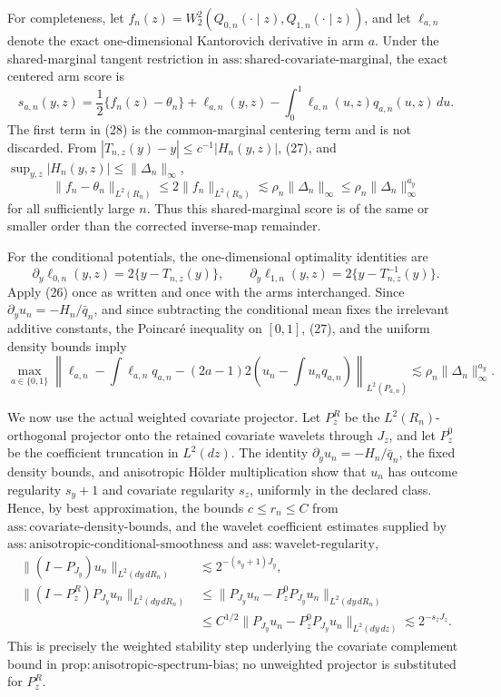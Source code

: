 For completeness, let \(f_n(z)=W_2^2(Q_{0,n}(\cdot\mid z),Q_{1,n}(\cdot\mid z))\), and let \(\ell_{a,n}\) denote the exact one-dimensional Kantorovich derivative in arm \(a\).  Under the shared-marginal tangent restriction in \(\mathrm{ass{:}shared\text{-}covariate\text{-}marginal}\), the exact centered arm score is
\[
s_{a,n}(y,z)
=\frac12\{f_n(z)-\theta_n\}
+\ell_{a,n}(y,z)-\int_0^1\ell_{a,n}(u,z)q_{a,n}(u,z)\,du.
\tag{28}
\]
The first term in (28) is the common-marginal centering term and is not discarded.  From \(|T_{n,z}(y)-y|\le c^{-1}|H_n(y,z)|\), (27), and \(\sup_{y,z}|H_n(y,z)|\le\|\Delta_n\|_\infty\),
\[
\|f_n-\theta_n\|_{L^2(R_n)}
\le2\|f_n\|_{L^2(R_n)}
\lesssim\rho_n\|\Delta_n\|_\infty
\le\rho_n\|\Delta_n\|_\infty^{a_y}
\tag{29}
\]
for all sufficiently large \(n\).  Thus this shared-marginal score is of the same or smaller order than the corrected inverse-map remainder.

For the conditional potentials, the one-dimensional optimality identities are
\[
\partial_y\ell_{0,n}(y,z)=2\{y-T_{n,z}(y)\},
\qquad
\partial_y\ell_{1,n}(y,z)=2\{y-T_{n,z}^{-1}(y)\}.
\]
Apply (26) once as written and once with the arms interchanged.  Since \(\partial_yu_n=-H_n/\bar q_n\), and since subtracting the conditional mean fixes the irrelevant additive constants, the Poincar\'e inequality on \([0,1]\), (27), and the uniform density bounds imply
\[
\max_{a\in\{0,1\}}
\left\|\ell_{a,n}-\int\ell_{a,n}q_{a,n}
-(2a-1)2\left(u_n-\int u_nq_{a,n}\right)\right\|_{L^2(P_{a,n})}
\lesssim \rho_n\|\Delta_n\|_\infty^{a_y}.
\tag{30}
\]

We now use the actual weighted covariate projector.  Let \(P_z^R\) be the \(L^2(R_n)\)-orthogonal projector onto the retained covariate wavelets through \(J_z\), and let \(P_z^0\) be the coefficient truncation in \(L^2(dz)\).  The identity \(\partial_yu_n=-H_n/\bar q_n\), the fixed density bounds, and anisotropic H\"older multiplication show that \(u_n\) has outcome regularity \(s_y+1\) and covariate regularity \(s_z\), uniformly in the declared class.  Hence, by best approximation, the bounds \(c\le r_n\le C\) from \(\mathrm{ass{:}covariate\text{-}density\text{-}bounds}\), and the wavelet coefficient estimates supplied by \(\mathrm{ass{:}anisotropic\text{-}conditional\text{-}smoothness}\) and \(\mathrm{ass{:}wavelet\text{-}regularity}\),
\[
\begin{aligned}
\|(I-P_{J_y})u_n\|_{L^2(dy\,dR_n)}&\lesssim2^{-(s_y+1)J_y},\\
\|(I-P_z^R)P_{J_y}u_n\|_{L^2(dy\,dR_n)}
&\le \|P_{J_y}u_n-P_z^0P_{J_y}u_n\|_{L^2(dy\,dR_n)}\\
&\le C^{1/2}\|P_{J_y}u_n-P_z^0P_{J_y}u_n\|_{L^2(dy\,dz)}
\lesssim2^{-s_zJ_z}.
\end{aligned}
\tag{31}
\]
This is precisely the weighted stability step underlying the covariate complement bound in \(\mathrm{prop{:}anisotropic\text{-}spectrum\text{-}bias}\); no unweighted projector is substituted for \(P_z^R\).

